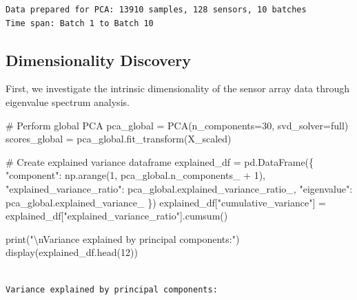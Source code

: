 \documentclass[
  letterpaper,
  DIV=11,
  numbers=noendperiod]{scrartcl}
\newenvironment{Shaded}{\begin{snugshade}}{\end{snugshade}}
\newcommand{\BuiltInTok}[1]{\textcolor[rgb]{0.00,0.23,0.31}{#1}}
\newcommand{\CharTok}[1]{\textcolor[rgb]{0.13,0.47,0.30}{#1}}
\newcommand{\CommentTok}[1]{\textcolor[rgb]{0.37,0.37,0.37}{#1}}
\newcommand{\DecValTok}[1]{\textcolor[rgb]{0.68,0.00,0.00}{#1}}
\newcommand{\NormalTok}[1]{\textcolor[rgb]{0.00,0.23,0.31}{#1}}
\newcommand{\OperatorTok}[1]{\textcolor[rgb]{0.37,0.37,0.37}{#1}}
\newcommand{\StringTok}[1]{\textcolor[rgb]{0.13,0.47,0.30}{#1}}
\renewenvironment{Shaded}{%
  \begin{tcolorbox}[%
    enhanced,%
    colback=codebg,%
    colframe=codebg,%
    borderline west={3pt}{0pt}{sectionblue},%
    fontupper=\small\ttfamily,%
    boxrule=0pt,%
    arc=0pt,%
    boxsep=5pt,%
    left=2mm,%
    right=2mm,%
    top=2mm,%
    bottom=2mm%
  ]%
}{%
  \end{tcolorbox}%
}
\begin{document}
\begin{verbatim}
Data prepared for PCA: 13910 samples, 128 sensors, 10 batches
Time span: Batch 1 to Batch 10
\end{verbatim}

\subsection{Dimensionality Discovery}\label{dimensionality-discovery}

First, we investigate the intrinsic dimensionality of the sensor array
data through eigenvalue spectrum analysis.

\begin{Shaded}
\begin{Highlighting}[]
\CommentTok{\# Perform global PCA}
\NormalTok{pca\_global }\OperatorTok{=}\NormalTok{ PCA(n\_components}\OperatorTok{=}\DecValTok{30}\NormalTok{, svd\_solver}\OperatorTok{=}\StringTok{\textquotesingle{}full\textquotesingle{}}\NormalTok{)}
\NormalTok{scores\_global }\OperatorTok{=}\NormalTok{ pca\_global.fit\_transform(X\_scaled)}

\CommentTok{\# Create explained variance dataframe}
\NormalTok{explained\_df }\OperatorTok{=}\NormalTok{ pd.DataFrame(\{}
    \StringTok{"component"}\NormalTok{: np.arange(}\DecValTok{1}\NormalTok{, pca\_global.n\_components\_ }\OperatorTok{+} \DecValTok{1}\NormalTok{),}
    \StringTok{"explained\_variance\_ratio"}\NormalTok{: pca\_global.explained\_variance\_ratio\_,}
    \StringTok{"eigenvalue"}\NormalTok{: pca\_global.explained\_variance\_}
\NormalTok{\})}
\NormalTok{explained\_df[}\StringTok{"cumulative\_variance"}\NormalTok{] }\OperatorTok{=}\NormalTok{ explained\_df[}\StringTok{"explained\_variance\_ratio"}\NormalTok{].cumsum()}

\BuiltInTok{print}\NormalTok{(}\StringTok{"}\CharTok{\textbackslash{}n}\StringTok{Variance explained by principal components:"}\NormalTok{)}
\NormalTok{display(explained\_df.head(}\DecValTok{12}\NormalTok{))}
\end{Highlighting}
\end{Shaded}

\begin{verbatim}

Variance explained by principal components:
\end{verbatim}
\end{document}
